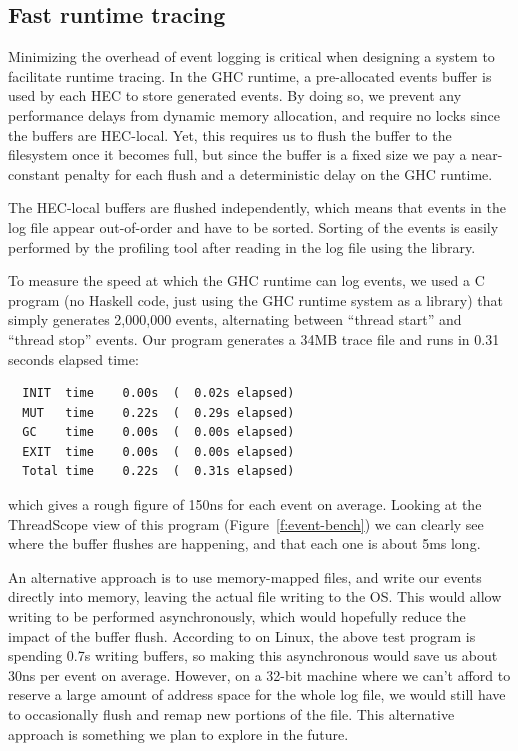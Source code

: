 \subsection{Fast runtime tracing}

Minimizing the overhead of event logging is critical when designing a system
to facilitate runtime tracing.  In the GHC runtime, a pre-allocated events buffer is 
used by each HEC to store generated events.
By doing so, we prevent any performance delays from dynamic 
memory allocation, and require no locks since the buffers are
HEC-local.  Yet, this requires us to flush the buffer
to the filesystem once it becomes full, but since the buffer is a
fixed size we pay a near-constant penalty for each flush and a
deterministic delay on the GHC runtime.

The HEC-local buffers are flushed independently, which means that
events in the log file appear out-of-order and have to be sorted.
Sorting of the events is easily performed by the profiling tool after
reading in the log file using the  library.

To measure the speed at which the GHC runtime can log events, we used
a C program (no Haskell code, just using the GHC runtime system as a
library) that simply generates 2,000,000 events, alternating between
``thread start'' and ``thread stop'' events.  Our program generates a
34MB trace file and runs in 0.31 seconds elapsed time:

\begin{verbatim}
  INIT  time    0.00s  (  0.02s elapsed)
  MUT   time    0.22s  (  0.29s elapsed)
  GC    time    0.00s  (  0.00s elapsed)
  EXIT  time    0.00s  (  0.00s elapsed)
  Total time    0.22s  (  0.31s elapsed)
\end{verbatim}
which gives a rough figure of 150ns for each event on average.
Looking at the ThreadScope view of this program
(Figure~\ref{f:event-bench}) we can clearly see where the buffer
flushes are happening, and that each one is about 5ms long.

An alternative approach is to use memory-mapped files, and write our
events directly into memory, leaving the actual file writing to the
OS.  This would allow writing to be performed asynchronously, which
would hopefully reduce the impact of the buffer flush.  According to
 on Linux, the above test program is spending 0.7s
writing buffers, so making this asynchronous would save us about 30ns
per event on average.  However, on a 32-bit machine where we can't
afford to reserve a large amount of address space for the whole log
file, we would still have to occasionally flush and remap new portions
of the file.  This alternative approach is something we plan to
explore in the future.

